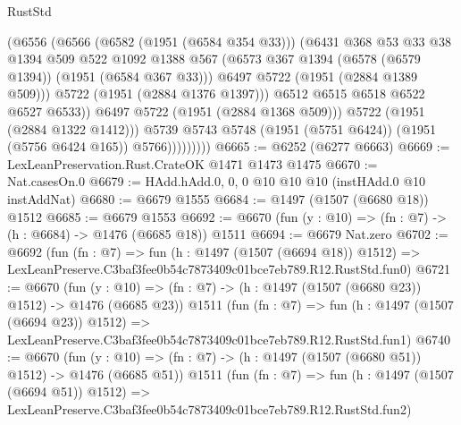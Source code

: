 \begin{lexlean}{RustStd}
\begin{coremodule}
                            (@6556
                              (@6566
                                (@6582 (@1951 (@6584 @354 @33)))
                                (@6431
                                  @368
                                  @53
                                  @33
                                  @38
                                  @1394
                                  @509
                                  @522
                                  @1092
                                  @1388
                                  @567
                                  (@6573 @367 @1394 (@6578 (@6579 @1394)) (@1951 (@6584 @367 @33)))
                                  @6497
                                  @5722
                                  (@1951 (@2884 @1389 @509)))
                                @5722
                                (@1951 (@2884 @1376 @1397)))
                              @6512
                              @6515
                              @6518
                              @6522
                              @6527
                              @6533))
                          @6497
                          @5722
                          (@1951 (@2884 @1368 @509)))
                        @5722
                        (@1951 (@2884 @1322 @1412)))
                      @5739
                      @5743
                      @5748
                      (@1951 (@5751 @6424))
                      (@1951 (@5756 @6424 @165))
                      @5766)))))))))
@6665 := @6252 (@6277 @6663)
@6669 := LexLeanPreservation.Rust.CrateOK @1471 @1473 @1475
@6670 := Nat.casesOn.{0}
@6679 := HAdd.hAdd.{0, 0, 0} @10 @10 @10 (instHAdd.{0} @10 instAddNat)
@6680 := @6679 @1555
@6684 := @1497 (@1507 (@6680 @18)) @1512
@6685 := @6679 @1553
@6692 := @6670 (fun (y : @10) => (fn : @7) -> (h : @6684) -> @1476 (@6685 @18)) @1511
@6694 := @6679 Nat.zero
@6702 := @6692
    (fun (fn : @7) =>
    fun (h : @1497 (@1507 (@6694 @18)) @1512) =>
    LexLeanPreserve.C3baf3fee0b54c7873409c01bce7eb789.R12.RustStd.fun0)
@6721 := @6670
    (fun (y : @10) => (fn : @7) -> (h : @1497 (@1507 (@6680 @23)) @1512) -> @1476 (@6685 @23))
    @1511
    (fun (fn : @7) =>
    fun (h : @1497 (@1507 (@6694 @23)) @1512) =>
    LexLeanPreserve.C3baf3fee0b54c7873409c01bce7eb789.R12.RustStd.fun1)
@6740 := @6670
    (fun (y : @10) => (fn : @7) -> (h : @1497 (@1507 (@6680 @51)) @1512) -> @1476 (@6685 @51))
    @1511
    (fun (fn : @7) =>
    fun (h : @1497 (@1507 (@6694 @51)) @1512) =>
    LexLeanPreserve.C3baf3fee0b54c7873409c01bce7eb789.R12.RustStd.fun2)

\end{coremodule}
\end{lexlean}
